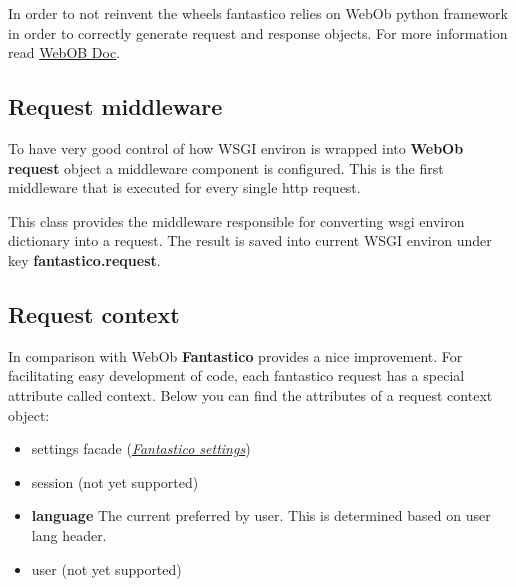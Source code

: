 \documentclass[letterpaper,10pt,english]{sphinxmanual}
\begin{document}
In order to not reinvent the wheels fantastico relies on WebOb python framework in order to correctly generate request and
response objects. For more information read \href{http://docs.webob.org/en/latest/reference.html}{WebOB Doc}.


\subsection{Request middleware}
\label{features/request_response:request-middleware}
To have very good control of how WSGI environ is wrapped into \textbf{WebOb request} object a middleware component is configured. This
is the first middleware that is executed for every single http request.

\begin{fulllineitems}
\label{features/request_response:fantastico.middleware.request_middleware.RequestMiddleware}
This class provides the middleware responsible for converting wsgi environ dictionary into a request. The result is saved
into current WSGI environ under key \textbf{fantastico.request}.

\end{fulllineitems}



\subsection{Request context}
\label{features/request_response:request-context}
In comparison with WebOb \textbf{Fantastico} provides a nice improvement. For facilitating easy development of code, each fantastico
request has a special attribute called context. Below you can find the attributes of a request context object:
\begin{itemize}
\item {} 
settings facade ({\hyperref[get_started/settings::doc]{\emph{Fantastico settings}}})

\item {} 
session (not yet supported)

\item {} 
\textbf{language} The current preferred by user. This is determined based on user lang header.

\item {} 
user (not yet supported)

\end{itemize}
\end{document}
